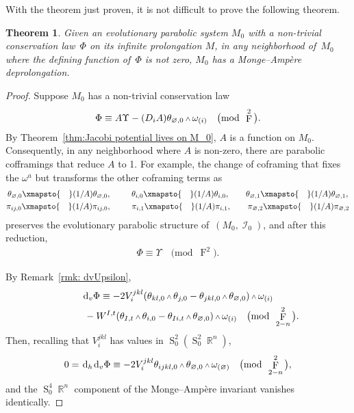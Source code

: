 \documentclass[pdftex]{sigma}
\DeclareMathOperator{\R}{\mathbb{R}}
\DeclareMathOperator{\Sym}{S}
\DeclareMathOperator{\I}{\mathcal{I}}
\renewcommand{\d}{{\rm d}}
\renewcommand{\mod}[1]{\quad\big(\mathrm{mod\enspace} #1\big)}
\newcommand{\w}{{\mathchoice{\,{\scriptstyle\wedge}\,}{{\scriptstyle\wedge}}
 {{\scriptscriptstyle\wedge}}{{\scriptscriptstyle\wedge}}}}
\newcommand{\thetas}[1]{\theta_{#1}}
\newcommand{\thetanot}{\thetas{\varnothing,0}}
\newcommand{\pis}[1]{\pi_{#1}}
\newcommand{\omegas}[1]{\omega_{(#1)}}
\DeclareMathOperator{\pwf}{F}
\renewcommand{\dh}{\ensuremath{\hspace{1pt} \d_h}}
\newcommand{\dv}{\ensuremath{\hspace{1pt} \d_v}}
\numberwithin{equation}{section}
\newtheorem{Theorem}{Theorem}[section]
\begin{document}
With the theorem just proven, it is not difficult to prove the following theorem.
\begin{Theorem}\label{thm:parabolics with conservation laws are MA}
 Given an evolutionary parabolic system $M_0$ with a non-trivial conservation law~$\Phi$ on its infinite prolongation $M$, in any neighborhood of~$M_0$ where the defining function of~$\Phi$ is not zero, $M_0$ has a Monge--Amp\`ere deprolongation.
\end{Theorem}
\begin{proof}
 Suppose $M_0$ has a non-trivial conservation law
 \begin{gather*}
 \Phi \equiv A\Upsilon - (D_i A)\thetas{\varnothing,0}\w\omegas{i} \mod{\pwf^2} .
 \end{gather*}
 By Theorem~\ref{thm:Jacobi potential lives on M_0}, $A$ is a function on $M_0$. Consequently, in any neighborhood where $A$ is non-zero, there are parabolic cofframings that reduce $A$ to 1. For example, the change of coframing that fixes the $\omega^a$ but transforms the other coframing terms as
 \begin{gather*}
 \thetas{\varnothing,0} \xmapsto{\quad} (1/A)\thetas{\varnothing,0},\qquad\ \,
 \thetas{i,0} \xmapsto{\quad} (1/A)\thetas{i,0}, \qquad
 \thetas{\varnothing,1} \xmapsto{\quad} (1/A)\thetas{\varnothing,1} ,
 \\
 \pis{ij,0} \xmapsto{\quad} (1/A)\pis{ij,0}, \qquad\ \,
 \pis{i,1} \xmapsto{\quad} (1/A)\pis{i,1}, \qquad
 \pis{\varnothing,2} \xmapsto{\quad} (1/A)\pis{\varnothing,2}
 \end{gather*}
 preserves the evolutionary parabolic structure of~$(M_0,\I_0)$, and after this reduction,
 \begin{gather*}
 \Phi \equiv \Upsilon \mod{\pwf^2} .
 \end{gather*}

 By Remark~\ref{rmk: dvUpsilon},
 \begin{gather*}
 \dv\Phi \equiv - 2V_i^{jkl}(\thetas{kl,0}\w\thetas{j,0} - \thetas{jkl,0}\w\thetanot)\w\omegas{i}
 \\ \hphantom{\dv\Phi \equiv}
{} - W^{I,t}(\thetas{I,t}\w\thetas{i,0} - \thetas{Ii,t}\w\thetanot)\w\omegas{i}
 \mod{\pwf^2_{2-n}} .
 \end{gather*}
 Then, recalling that $V_i^{jkl}$ has values in $\Sym_0^2 (\Sym_0^2 \R^n)$,
 \begin{gather*}
 0 = \dh\dv\Phi \equiv -2V_i^{jkl}\thetas{ijkl,0}\w\thetanot\w\omegas{\varnothing} \mod{\pwf^2_{2-n}} ,
 \end{gather*}
 and the $\Sym_0^4 \R^n$ component of the Monge--Amp\`ere invariant vanishes identically.
\end{proof}
\end{document}
